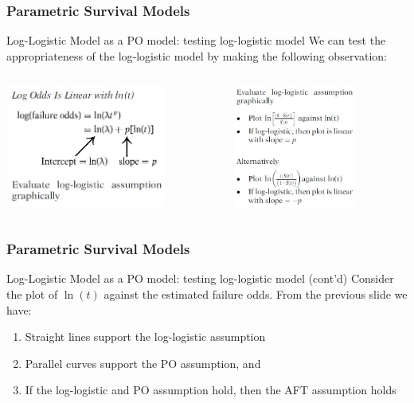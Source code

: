 \documentclass{beamer}
\theoremstyle{definition}
\begin{document}
\begin{frame}
\frametitle{Parametric Survival Models}
\begin{block}{Log-Logistic Model as a PO model: testing log-logistic model}
We can test the appropriateness of the log-logistic model by making the following observation:
\begin{columns}
    \begin{column}{0.48\textwidth}
        \includegraphics[width =\textwidth, height=4cm]{loglogistic1.JPG}
    \end{column}
    \hspace{-10pt}
    \begin{column}{0.48\textwidth}
         \includegraphics[width =\textwidth, height=4cm]{loglogistic2.JPG}
    \end{column}
\end{columns}
\end{block}
\end{frame}
%
\begin{frame}
\frametitle{Parametric Survival Models}
\begin{block}{Log-Logistic Model as a PO model: testing log-logistic model (cont'd)}
Consider the plot of $\ln(t)$ against the estimated failure odds. From the previous slide we have:
\begin{enumerate}
\item Straight lines support the log-logistic assumption
\item Parallel curves support the PO assumption, and
\item If the log-logistic and PO assumption hold, then the AFT assumption holds
\end{enumerate}
\end{block}
\end{frame}
\end{document}
